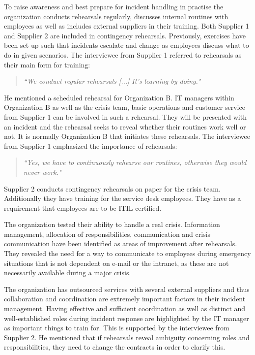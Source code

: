 To raise awareness and best prepare for incident handling in practise the organization conducts rehearsals regularly, discusses internal routines with employees as well as includes external suppliers in their training. Both Supplier 1 and Supplier 2 are included in contingency rehearsals. Previously, exercises have been set up such that incidents escalate and change as employees discuss what to do in given scenarios. The interviewee from Supplier 1 referred to rehearsals as their main form for training:

\begin{quote}
\textit{``We conduct regular rehearsals [...] It's learning by doing."}
\end{quote}

He mentioned a scheduled rehearsal for Organization B. IT managers within Organization B as well as the crisis team, basic operations and customer service from Supplier 1 can be involved in such a rehearsal. They will be presented with an incident and the rehearsal seeks to reveal whether their routines work well or not. It is normally Organization B that initiates these rehearsals. The interviewee from Supplier 1 emphasized the importance of rehearsals:

\begin{quote}
\textit{``Yes, we have to continuously rehearse our routines, otherwise they would never work."}
\end{quote}

Supplier 2 conducts contingency rehearsals on paper for the crisis team. Additionally they have training for the service desk employees. They have as a requirement that employees are to be \ac{ITIL} certified.

The organization tested their ability to handle a real crisis. Information management, allocation of responsibilities, communication and crisis communication have been identified as areas of improvement after rehearsals. They revealed the need for a way to communicate to employees during emergency situations that is not dependent on e-mail or the intranet, as these are not necessarily available during a major crisis.

The organization has outsourced services with several external suppliers and thus collaboration and coordination are extremely important factors in their incident management. Having effective and sufficient coordination as well as distinct and well-established roles during incident response are highlighted by the IT manager as important things to train for. This is supported by the interviewee from Supplier 2. He mentioned that if rehearsals reveal ambiguity concerning roles and responsibilities, they need to change the contracts in order to clarify this.

